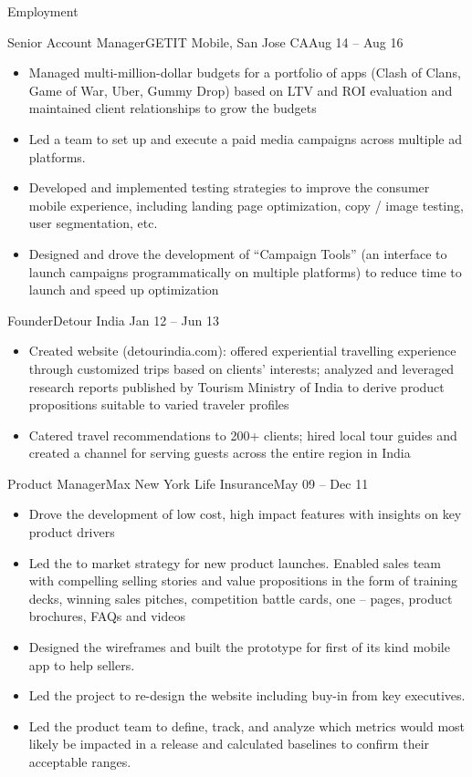 \documentclass[]{mcdowellcv}
\begin{document}
\begin{cvsection}{Employment}
		\begin{cvsubsection}{Senior Account Manager}{GETIT Mobile, San Jose CA}{Aug 14 -- Aug 16}
			\begin{itemize}
				\item Managed multi-million-dollar budgets for a portfolio of apps (Clash of Clans, Game of War, Uber, Gummy Drop) based on LTV and ROI evaluation and maintained client relationships to grow the budgets
				\item Led a team to set up and execute a paid media campaigns across multiple ad platforms.
				\item Developed and implemented testing strategies to improve the consumer mobile experience, including landing page optimization, copy / image testing, user segmentation, etc.
				\item Designed and drove the development of “Campaign Tools” (an interface to launch campaigns programmatically on multiple platforms) to reduce time to launch and speed up optimization
			\end{itemize}
		\end{cvsubsection}

		\begin{cvsubsection}{Founder}{Detour India }{Jan 12 -- Jun 13}
			\begin{itemize}
				\item Created website (detourindia.com): offered experiential travelling experience through customized trips based on clients’ interests; analyzed and leveraged research reports published by Tourism Ministry of India to derive product propositions suitable to varied traveler profiles
				\item Catered travel recommendations to 200+ clients; hired local tour guides and created a channel for serving guests across the entire region in India
			\end{itemize}
		\end{cvsubsection}

		\begin{cvsubsection}{Product Manager}{Max New York Life Insurance}{May 09 -- Dec 11}
			\begin{itemize}
				\item Drove the development of low cost, high impact features with insights on key product drivers
				\item Led the to market strategy for new product launches. Enabled sales team with compelling selling stories and value propositions in the form of training decks, winning sales pitches, competition battle cards, one – pages, product brochures, FAQs and videos 
				\item Designed the wireframes and built the prototype for first of its kind mobile app to help sellers.
				\item Led the project to re-design the website including buy-in from key executives.  
				\item Led the product team to define, track, and analyze which metrics would most likely be impacted in a release and calculated baselines to confirm their acceptable ranges.
			\end{itemize}
		\end{cvsubsection}


\end{cvsection}
\end{document}
